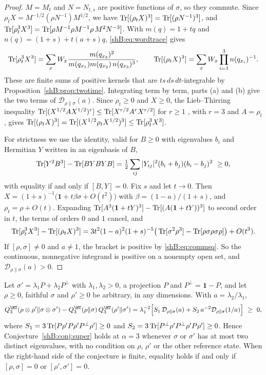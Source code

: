 \begin{proof}
$M=M_t$ and $N=N_{t,s}$ are positive functions of $\sigma$, so they commute. Since $\rho_tX=M^{-1/2}(\rho N^{-1})M^{1/2}$, we have $\operatorname{Tr}[(\rho_tX)^3]=\operatorname{Tr}[(\rho N^{-1})^3]$, and $\operatorname{Tr}[\rho_t^3X^3]=\operatorname{Tr}[\rho M^{-1}\rho M^{-1}\rho\,M^2N^{-3}]$. With $m(q)=1+tq$ and $n(q)=(1+s)+t(a+s)q$, \eqref{shB:eq:wordtrace} gives
\[
\operatorname{Tr}[\rho_t^3X^3]=\sum_xW_x\frac{m(q_{x_3})^2}{m(q_{x_1})m(q_{x_2})\,n(q_{x_3})^3},\qquad\operatorname{Tr}[(\rho_tX)^3]=\sum_xW_x\prod_{i=1}^3n(q_{x_i})^{-1}.
\]
These are finite sums of positive kernels that are $ts\,ds\,dt$-integrable by Proposition~\ref{shB:prop:twotime}. Integrating term by term, parts (a) and (b) give the two terms of $\mathcal D_{\rho\|\sigma}(a)$. Since $\rho_t\ge0$ and $X\ge0$, the Lieb--Thirring inequality $\operatorname{Tr}[(X^{1/2}AX^{1/2})^r]\le\operatorname{Tr}[X^{r/2}A^rX^{r/2}]$ for $r\ge1$ \cite{LiebThirring1976,Araki1990}, with $r=3$ and $A=\rho_t$, gives $\operatorname{Tr}[(\rho_tX)^3]=\operatorname{Tr}[(X^{1/2}\rho_tX^{1/2})^3]\le\operatorname{Tr}[\rho_t^3X^3]$.

For strictness we use the identity, valid for $B\ge0$ with eigenvalues $b_i$ and Hermitian $Y$ written in an eigenbasis of $B$,
\begin{equation}\label{shB:eq:commsq}
\Tr[Y^2B^3]-\Tr[BYBYB]=\tfrac12\sum_{ij}|Y_{ij}|^2(b_i+b_j)(b_i-b_j)^2\ \ge0,
\end{equation}
with equality if and only if $[B,Y]=0$. Fix $s$ and let $t\to0$. Then $X=(1+s)^{-1}\big(\mathbf 1+t\beta\sigma+O(t^2)\big)$ with $\beta=(1-a)/(1+s)$, and $\rho_t=\rho+O(t)$. Expanding $\operatorname{Tr}[A^3(\mathbf 1+tY)^3]-\operatorname{Tr}[(A(\mathbf 1+tY))^3]$ to second order in $t$, the terms of orders $0$ and $1$ cancel, and
\[
\operatorname{Tr}[\rho_t^3X^3]-\operatorname{Tr}[(\rho_tX)^3]=3t^2(1-a)^2(1+s)^{-5}\big(\operatorname{Tr}[\sigma^2\rho^3]-\operatorname{Tr}[\rho\sigma\rho\sigma\rho]\big)+O(t^3).
\]
If $[\rho,\sigma]\ne0$ and $a\ne1$, the bracket is positive by \eqref{shB:eq:commsq}. So the continuous, nonnegative integrand is positive on a nonempty open set, and $\mathcal D_{\rho\|\sigma}(a)>0$.
\end{proof}

\begin{corollary}[Super-multiplicativity at $\alpha=3$ against two-level partners]\label{shB:cor:twolevel}
Let $\sigma'=\lambda_1P+\lambda_2P^\perp$ with $\lambda_1,\lambda_2>0$, a projection $P$ and $P^\perp=\mathbf 1-P$, and let $\rho\ge0$, faithful $\sigma$ and $\rho'\ge0$ be arbitrary, in any dimensions. With $a=\lambda_2/\lambda_1$,
\[
Q^\HT_3(\rho\otimes\rho'\|\sigma\otimes\sigma')-Q^\HT_3(\rho\|\sigma)\,Q^\HT_3(\rho'\|\sigma')=\lambda_1^{-2}\Big[S_1\,\mathcal D_{\rho\|\sigma}(a)+S_2\,a^{-2}\mathcal D_{\rho\|\sigma}(1/a)\Big]\ \ge\ 0,
\]
where $S_1=3\operatorname{Tr}[P\rho'P\rho'P^\perp\rho']\ge0$ and $S_2=3\operatorname{Tr}[P^\perp\rho'P^\perp\rho'P\rho']\ge0$. Hence Conjecture~\ref{shB:conj:super} holds at $\alpha=3$ whenever $\sigma$ or $\sigma'$ has at most two distinct eigenvalues, with no condition on $\rho$, $\rho'$ or the other reference state. When the right-hand side of the conjecture is finite, equality holds if and only if $[\rho,\sigma]=0$ or $[\rho',\sigma']=0$.
\end{corollary}

